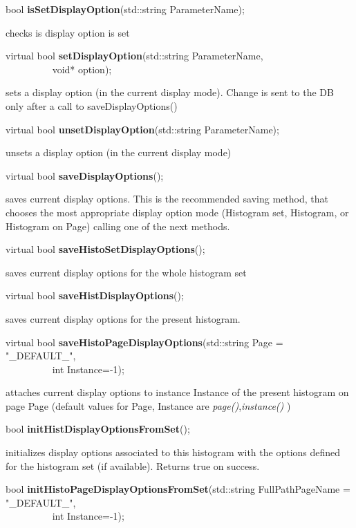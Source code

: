 \item    bool {\bf isSetDisplayOption}(std::string ParameterName);


 checks is display option is set


\item    virtual bool {\bf setDisplayOption}(std::string ParameterName,\\\mbox{}~~~~~~~~~
			void* option);

 sets a display option (in the current display mode). Change is sent to the DB only 
 after a call to saveDisplayOptions()


\item    virtual bool {\bf unsetDisplayOption}(std::string ParameterName);


 unsets a display option (in the current display mode)


\item    virtual bool {\bf saveDisplayOptions}();


 saves current display options.  This is the recommended saving method, that
 chooses the most appropriate display option mode 
 (Histogram set, Histogram, or Histogram on Page) calling one of the next methods.


\item    virtual bool {\bf saveHistoSetDisplayOptions}();


 saves current display options for the whole histogram set


\item    virtual bool {\bf saveHistDisplayOptions}();


 saves current display options for the present histogram.


\item    virtual bool {\bf saveHistoPageDisplayOptions}(std::string Page = "\_DEFAULT\_",\\\mbox{}~~~~~~~~~
					   int Instance=-1);

 attaches current display options to instance Instance of the present histogram on page 
 Page (default values for Page, Instance are {\it page()},{\it instance()}  )


\item    bool {\bf initHistDisplayOptionsFromSet}(); 


 initializes display options associated to this histogram with the
 options defined for the histogram set (if available). Returns true on
 success.


\item    bool {\bf initHistoPageDisplayOptionsFromSet}(std::string FullPathPageName = "\_DEFAULT\_",\\\mbox{}~~~~~~~~~
					  int Instance=-1);

